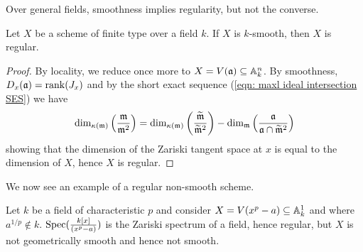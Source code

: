 Over general fields, smoothness implies regularity, but not the converse. 
\begin{corollary}\label{corr: smooth implies regular}
    Let $X$ be a scheme of finite type over a field $k$. If $X$ is $k$-smooth, then $X$ is regular. 
\end{corollary}
\begin{proof}
    By locality, we reduce once more to $X=V(\mathfrak{a})\subseteq\mathbb{A}^{n}_{k}$. By smoothness, $D_{x}(\mathfrak{a})=\mathrm{rank}(J_{x})$ and by the short exact sequence (\ref{eqn: maxl ideal intersection SES}) we have 
    $$\dim_{\kappa(\mathfrak{m})}\left(\frac{\mathfrak{m}}{\mathfrak{m}^{2}}\right)=\dim_{\kappa(\mathfrak{m})}\left(\frac{\widetilde{\mathfrak{m}}}{\widetilde{\mathfrak{m}}^{2}}\right)-\dim_{\mathfrak{m}}\left(\frac{\mathfrak{a}}{\mathfrak{a}\cap\widetilde{\mathfrak{m}}^{2}}\right)$$
    showing that the dimension of the Zariski tangent space at $x$ is equal to the dimension of $X$, hence $X$ is regular. 
\end{proof}
We now see an example of a regular non-smooth scheme. 
\begin{example}
    Let $k$ be a field of characteristic $p$ and consider $X=V(x^{p}-a)\subseteq \mathbb{A}^{1}_{k}$ and where $a^{1/p}\notin k$. $\operatorname{Spec}(\frac{k[x]}{(x^{p}-a)})$ is the Zariski spectrum of a field, hence regular, but $X$ is not geometrically smooth and hence not smooth. 
\end{example}